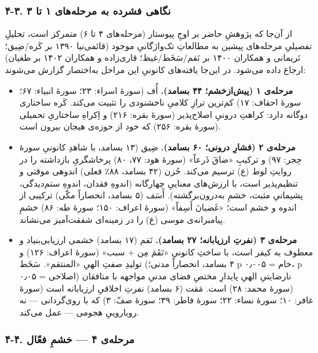 \begin{RTL}
\begin{otherlanguage}{persian}
\subsubsection{۴-۳. نگاهی فشرده به مرحله‌های ۱ تا
۳}\label{ux646ux6afux627ux647ux6cc-ux641ux634ux631ux62fux647-ux628ux647-ux645ux631ux62dux644ux647ux647ux627ux6cc-ux6f1-ux62aux627-ux6f3}

از آن‌جا که پژوهشِ حاضر بر اوجِ پیوستار (مرحله‌های ۴ تا ۶) متمرکز است، تحلیلِ
تفصیلیِ مرحله‌های پیشین به مطالعاتِ تک‌واژگانیِ موجود (قائمی‌نیا ۱۳۹۰ بر
کَره/ضِیق؛ نَریمانی و همکاران ۱۴۰۰ بر نَقم/سَخَط/غیظ؛ قاری‌زاده و همکاران ۱۴۰۲
بر طغیان) ارجاع داده می‌شود. در این‌جا یافته‌های کانونیِ این مراحل به‌اختصار
گزارش می‌شوند:

\begin{itemize}
\tightlist
\item
  \textbf{مرحله‌ی ۱ (پیش‌ازخشم؛ ۴۴ بسامد).} أُف (سورۀ اسراء: ۲۳؛ سورۀ
  انبیاء: ۶۷؛ سورۀ احقاف: ۱۷) کم‌ترین ترازِ کلامیِ ناخشنودی را تثبیت می‌کند.
  کَره ساختاری دوگانه دارد: کراهتِ درونیِ اصلاح‌پذیر (سورۀ بقره: ۲۱۶) و
  اِکراهِ ساختاریِ تحمیلی (سورۀ بقره: ۲۵۶) که خود از حوزه‌ی هیجان بیرون است.
\item
  \textbf{مرحله‌ی ۲ (فشارِ درونی؛ ۶۰ بسامد).} ضِیق (۱۳ بسامد، با شاهدِ
  کانونیِ سورۀ حِجر: ۹۷) و ترکیبِ «ضاقَ ذَرعاً» (سورۀ هود: ۷۷، ۸۰) پرخاشگریِ
  بازداشته را در روایتِ لوط (ع) ترسیم می‌کند. حُزن (۴۲ بسامد، ۸۸٪ فعلی)
  اندوهی موقتی و تنظیم‌پذیر است، با ارزش‌های معناییِ چهارگانه (اندوهِ فقدان،
  اندوهِ ستم‌دیدگی، پشیمانیِ مثبت، خشمِ به‌درون‌برگشته). أَسَف (۵ بسامد، انحصاراً
  مکّی) ترکیبی از اندوه و خشم است؛ «غَضبانَ أَسِفاً» (سورۀ اعراف: ۱۵۰؛ سورۀ
  طه: ۸۶) خشمِ پیامبرانه‌ی موسی (ع) را در زمینه‌ای شفقت‌آمیز می‌نشاند.
\item
  \textbf{مرحله‌ی ۳ (نفرتِ ارزیابانه؛ ۲۷ بسامد).} نَقم (۱۷ بسامد) خشمی
  ارزیابی‌بنیاد و معطوف به کیفر است، با ساختِ کانونیِ «نَقَمَ مِن + سبب» (سورۀ
  اعراف: ۱۲۶) و تولیدِ صفتِ الهیِ «المنتقم». سَخَط (۴ بسامد، انحصاراً مدنی؛ p
  خام = ۰٫۰۰۵، p اصلاحی = ۰٫۰۵) نارضایتیِ الهیِ پایدارِ مختصِ فضای مدنیِ
  مواجهه با منافقان (سورۀ محمد: ۲۸) است. مَقت (۶ بسامد) نفرتِ اخلاقیِ
  ارزیابانه است (سورۀ غافر: ۱۰؛ سورۀ نساء: ۲۲؛ سورۀ فاطر: ۳۹؛ سورۀ صفّ:
  ۳) که با روی‌گردانی --- نه رویاروییِ هجومی --- عمل می‌کند.
\end{itemize}

\subsubsection{۴-۴. مرحله‌ی ۴ --- خشمِ
فعّال}\label{ux645ux631ux62dux644ux647ux6cc-ux6f4-ux62eux634ux645-ux641ux639ux627ux644}


\end{otherlanguage}
\end{RTL}
